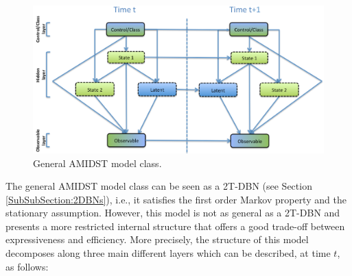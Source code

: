 \begin{figure}[ht!]
\begin{center}
\includegraphics[scale=0.465]{./figures/AMIDSTModelClass}
\caption{\label{Figure:AMIDSTModelClass} General AMIDST model class.}
\end{center}
\end{figure}

The general AMIDST model class can be seen as a 2T-DBN (see Section \ref{SubSubSection:2DBNs}), i.e., it satisfies the first order Markov property and the stationary assumption. However, this model is not as general as a 2T-DBN and presents a more restricted internal structure that offers a good trade-off between expressiveness and efficiency. More precisely, the structure of this model decomposes along three main different layers which can be described, at time $t$, as follows:

